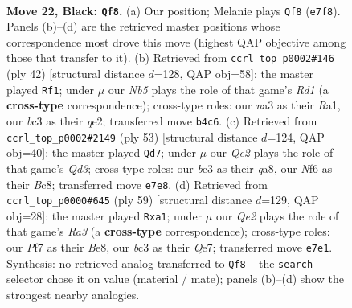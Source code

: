 \documentclass[11pt]{article}
\begin{document}
\clearpage

\begin{figure}[p]\centering
\begin{subfigure}{0.46\textwidth}\centering
\resizebox{\linewidth}{!}{%
\newchessgame
\chessboard[
  setfen={2b5/1p2qpkp/r4np1/p5N1/Pn6/NPB3P1/5PBP/R3R1K1 b - - 0 22},
  showmover=false,
  pgfstyle=straightmove, color=movearrow, markmove={e7-f8}
]}
\caption{}
\end{subfigure}\hfill
\begin{subfigure}{0.46\textwidth}\centering
\resizebox{\linewidth}{!}{%
\newchessgame
\chessboard[
  setfen={1k1r1r2/pbp1b1pp/1p6/4p3/4N3/P3P1P1/1P2qPBP/RQ1R2K1 w - - 5 22},
  showmover=false,
  pgfstyle=straightmove, color=movearrow, markmove={d1-f1}
]}
\caption{}
\end{subfigure}
\\[4pt]
\begin{subfigure}{0.46\textwidth}\centering
\resizebox{\linewidth}{!}{%
\newchessgame
\chessboard[
  setfen={Q1b4r/2p3bk/p1nq3p/3n4/1p2N3/3PB3/PPP3PP/1K2RR2 b - - 6 27},
  showmover=false,
  pgfstyle=straightmove, color=movearrow, markmove={d6-d7}
]}
\caption{}
\end{subfigure}\hfill
\begin{subfigure}{0.46\textwidth}\centering
\resizebox{\linewidth}{!}{%
\newchessgame
\chessboard[
  setfen={3rb1k1/4qn1p/r1pp2p1/1n3p2/1P3P2/1NN1P1PP/1Q4B1/R3R1K1 b - - 5 30},
  showmover=false,
  pgfstyle=straightmove, color=movearrow, markmove={a6-a1}
]}
\caption{}
\end{subfigure}
\caption{\textbf{Move 22, Black: \texttt{Qf8}.} (a) Our position; Melanie plays \texttt{Qf8} (\texttt{e7f8}). Panels (b)--(d) are the retrieved master positions whose correspondence most drove this move (highest QAP objective among those that transfer to it). (b) Retrieved from \texttt{ccrl\_top\_p0002\#146} (ply 42) [structural distance $d$=128, QAP obj=58]: the master played \texttt{Rf1}; under $\mu$ our \emph{Nb5} plays the role of that game's \emph{Rd1} (a \textbf{cross-type} correspondence); cross-type roles: our \emph{n}a3 as their \emph{R}a1, our \emph{b}c3 as their \emph{q}e2; transferred move \texttt{b4c6}. (c) Retrieved from \texttt{ccrl\_top\_p0002\#2149} (ply 53) [structural distance $d$=124, QAP obj=40]: the master played \texttt{Qd7}; under $\mu$ our \emph{Qe2} plays the role of that game's \emph{Qd3}; cross-type roles: our \emph{b}c3 as their \emph{q}a8, our \emph{N}f6 as their \emph{B}c8; transferred move \texttt{e7e8}. (d) Retrieved from \texttt{ccrl\_top\_p0000\#645} (ply 59) [structural distance $d$=129, QAP obj=28]: the master played \texttt{Rxa1}; under $\mu$ our \emph{Qe2} plays the role of that game's \emph{Ra3} (a \textbf{cross-type} correspondence); cross-type roles: our \emph{P}f7 as their \emph{B}e8, our \emph{b}c3 as their \emph{Q}e7; transferred move \texttt{e7e1}. Synthesis: no retrieved analog transferred to \texttt{Qf8} -- the \texttt{search} selector chose it on value (material / mate); panels (b)--(d) show the strongest nearby analogies.}
\label{fig:thought-m43}
\end{figure}
\end{document}
